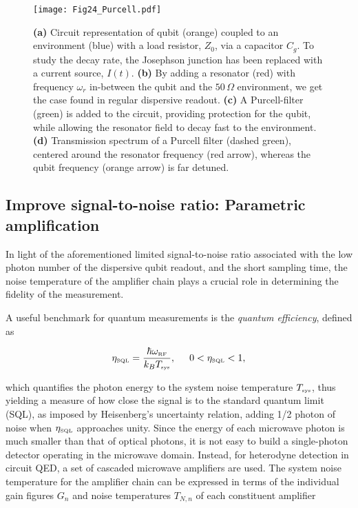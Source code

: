 \documentclass[aip,apr,twocolumn,showpacs,superscriptaddress,groupedaddress,nofootinbib,reprint]{revtex4-1}  %
\begin{document}
\begin{figure}[htp!]
\begin{center}
\texttt{[image: Fig24\_Purcell.pdf]}
\caption{\textbf{(a)} Circuit representation of qubit (orange) coupled to an environment (blue) with a load resistor, $Z_0$, via a capacitor $C_g$. To study the decay rate, the Josephson junction has been replaced with a current source, $I(t)$. \textbf{(b)} By adding a resonator (red) with frequency $\omega_r$ in-between the qubit and the $50\,\Omega$ environment, we get the case found in regular dispersive readout. \textbf{(c)} A Purcell-filter (green) is added to the circuit, providing protection for the qubit, while allowing the resonator field to decay fast to the environment. \textbf{(d)} Transmission spectrum of a Purcell filter (dashed green), centered around the resonator frequency (red arrow), whereas the qubit frequency (orange arrow) is far detuned.}
\label{Fig:PurcellFilter}
\end{center}
\end{figure}

\subsection{Improve signal-to-noise ratio: Parametric amplification}

In light of the aforementioned limited signal-to-noise ratio associated with the low photon number of the dispersive qubit readout, and the short sampling time, the noise temperature of the amplifier chain plays a crucial role in determining the fidelity of the measurement.

A useful benchmark for quantum measurements is the \textit{quantum efficiency}, defined as

\begin{equation}
\eta_{\mbox{\tiny{SQL}}} = \frac{\hbar \omega_{\mbox{\tiny{RF}}}}{k_B T_{\mbox{\tiny{sys}}}}, \hspace{0.5cm} 0< \eta_{\mbox{\tiny{SQL}}} < 1,
\label{Eq:Eta}
\end{equation}

\noindent which quantifies the photon energy to the system noise temperature $T_{\mbox{\tiny{sys}}}$, thus yielding a measure of how close the signal is to the standard quantum limit (SQL), as imposed by Heisenberg's uncertainty relation, adding 1/2 photon of noise when $\eta_{\mbox{\tiny{SQL}}}$ approaches unity. Since the energy of each microwave photon is much smaller than that of optical photons, it is not easy to build a single-photon detector operating in the microwave domain\cite{Hoi2011,Inomata2016}. Instead, for heterodyne detection in circuit QED, a set of cascaded microwave amplifiers are used. The system noise temperature for the amplifier chain can be expressed in terms of the individual gain figures $G_n$ and noise temperatures $T_{N,n}$ of each constituent amplifier\cite{Pozar2004}
\end{document}
